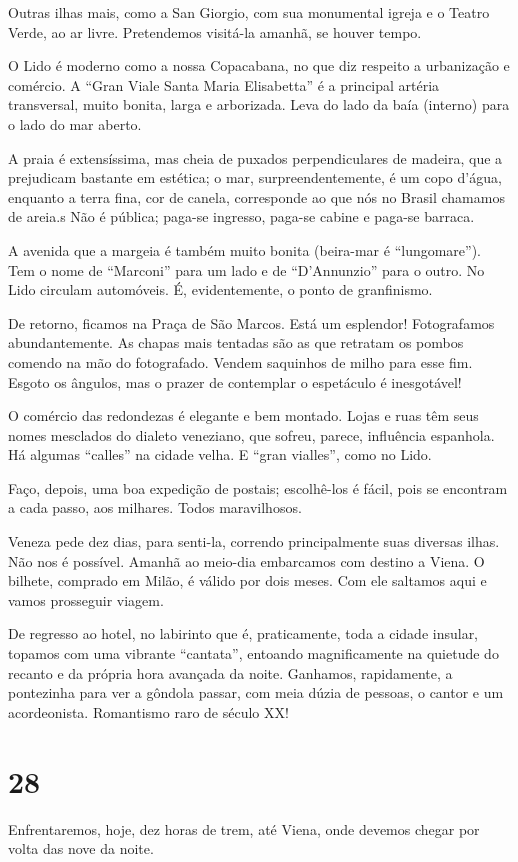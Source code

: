 Outras ilhas mais, como a San Giorgio, com sua monumental igreja e o Teatro Verde, ao ar livre. Pretendemos visitá-la amanhã, se houver tempo.

O Lido é moderno como a nossa Copacabana, no que diz respeito a urbanização e comércio. A ``Gran Viale Santa Maria Elisabetta'' é a principal artéria transversal, muito bonita, larga e arborizada. Leva do lado da baía (interno) para o lado do mar aberto.

A praia é extensíssima, mas cheia de puxados perpendiculares de madeira, que a prejudicam bastante em estética; o mar, surpreendentemente, é um copo d’água, enquanto a terra fina, cor de canela, corresponde ao que nós no Brasil chamamos de areia.s Não é pública; paga-se ingresso, paga-se cabine e paga-se barraca.

A avenida que a margeia é também muito bonita (beira-mar é ``lungomare''). Tem o nome de ``Marconi'' para um lado e de ``D’Annunzio'' para o outro. No Lido circulam automóveis. É, evidentemente, o ponto de granfinismo.

De retorno, ficamos na Praça de São Marcos. Está um esplendor! Fotografamos abundantemente. As chapas mais tentadas são as que retratam os pombos comendo na mão do fotografado. Vendem saquinhos de milho para esse fim. Esgoto os ângulos, mas o prazer de contemplar o espetáculo é inesgotável!

O comércio das redondezas é elegante e bem montado. Lojas e ruas têm seus nomes mesclados do dialeto veneziano, que sofreu, parece, influência espanhola. Há algumas ``calles'' na cidade velha. E ``gran vialles'', como no Lido.

Faço, depois, uma boa expedição de postais; escolhê-los é fácil, pois se encontram a cada passo, aos milhares. Todos maravilhosos.

Veneza pede dez dias, para senti-la, correndo principalmente suas diversas ilhas. Não nos é possível. Amanhã ao meio-dia embarcamos com destino a Viena. O bilhete, comprado em Milão, é válido por dois meses. Com ele saltamos aqui e vamos prosseguir viagem.

De regresso ao hotel, no labirinto que é, praticamente, toda a cidade insular, topamos com uma vibrante ``cantata'', entoando magnificamente na quietude do recanto e da própria hora avançada da noite. Ganhamos, rapidamente, a pontezinha para ver a gôndola passar, com meia dúzia de pessoas, o cantor e um acordeonista. Romantismo raro de século XX!

\section*{28 \adfflatleafright {}}
Enfrentaremos, hoje, dez horas de trem, até Viena, onde devemos chegar por volta das nove da noite.

